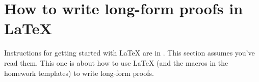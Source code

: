 \section{How to write long-form proofs in LaTeX}\label{proofs: sec: latex}\hypertarget{proofs.latex}{}


Instructions for getting started with LaTeX are in .
This section assumes you've read them.
This one is about how to use LaTeX (and the macros in the homework templates) to write long-form proofs.



% 

% 


% 

